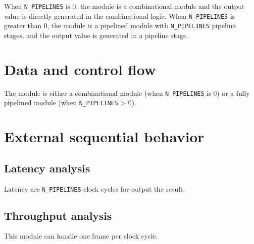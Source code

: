 \documentclass[a4paper, oneside]{report}
\begin{document}
                When \texttt{N\_PIPELINES} is 0, the module is a combinational module and the output value is directly generated in the combinational logic. When \texttt{N\_PIPELINES} is greater than 0, the module is a pipelined module with \texttt{N\_PIPELINES} pipeline stages, and the output value is generated in a pipeline stage.
                
        \section{Data and control flow}
            The module is either a combinational module (when \texttt{N\_PIPELINES} is 0) or a fully pipelined module (when \texttt{N\_PIPELINES} > 0). 
            \section{External sequential behavior}
            \subsection{Latency analysis}
                Latency are \texttt{N\_PIPELINES} clock cycles for output the result.
            \subsection{Throughput analysis}
                This module can handle one frame per clock cycle.


\end{document}
